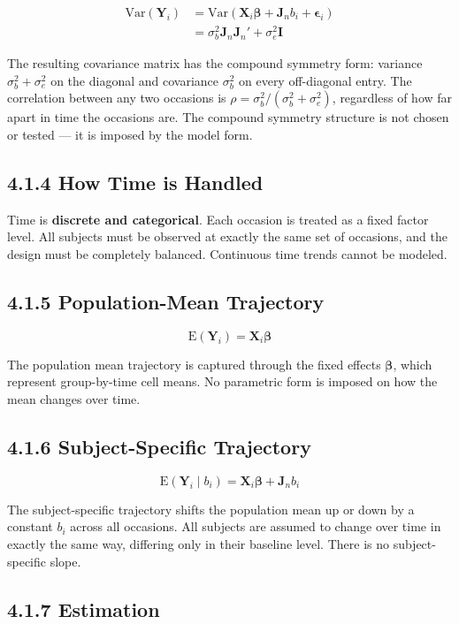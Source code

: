 \documentclass[11pt]{article}
\newcommand{\bY}{\mathbf{Y}}
\newcommand{\bX}{\mathbf{X}}
\newcommand{\bbeta}{\boldsymbol{\beta}}
\newcommand{\bepsilon}{\boldsymbol{\epsilon}}
\newcommand{\E}{\mathrm{E}}
\newcommand{\Var}{\mathrm{Var}}
\begin{document}
\begin{align*}
\Var(\bY_i) &= \Var(\bX_i\bbeta + \mathbf{J}_n b_i + \bepsilon_i) \\
            &= \sigma_b^2 \mathbf{J}_n \mathbf{J}_n' + \sigma_e^2 \mathbf{I}
\end{align*}

The resulting covariance matrix has the compound symmetry form: variance $\sigma_b^2 + \sigma_e^2$ on the diagonal and covariance $\sigma_b^2$ on every off-diagonal entry. The correlation between any two occasions is $\rho = \sigma_b^2 / (\sigma_b^2 + \sigma_e^2)$, regardless of how far apart in time the occasions are. The compound symmetry structure is not chosen or tested --- it is imposed by the model form.

\subsection*{4.1.4 How Time is Handled}

Time is \textbf{discrete and categorical}. Each occasion is treated as a fixed factor level. All subjects must be observed at exactly the same set of occasions, and the design must be completely balanced. Continuous time trends cannot be modeled.

\subsection*{4.1.5 Population-Mean Trajectory}

$$\E(\bY_i) = \bX_i \bbeta$$

The population mean trajectory is captured through the fixed effects $\bbeta$, which represent group-by-time cell means. No parametric form is imposed on how the mean changes over time.

\subsection*{4.1.6 Subject-Specific Trajectory}

$$\E(\bY_i \mid b_i) = \bX_i \bbeta + \mathbf{J}_n b_i$$

The subject-specific trajectory shifts the population mean up or down by a constant $b_i$ across all occasions. All subjects are assumed to change over time in exactly the same way, differing only in their baseline level. There is no subject-specific slope.

\subsection*{4.1.7 Estimation}
\end{document}
